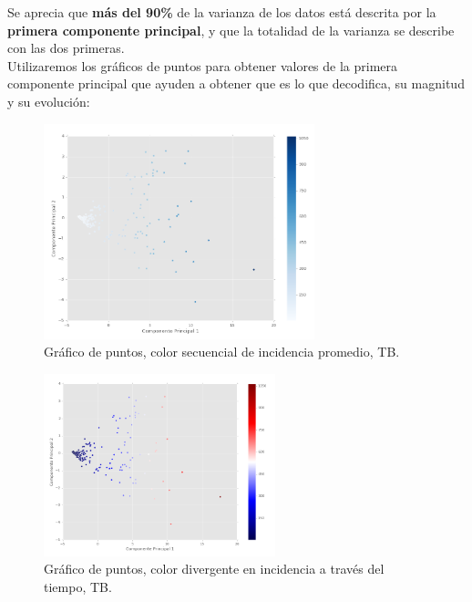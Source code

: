 \documentclass[letter, 10pt]{article}
\begin{document}
Se aprecia que \textbf{más del 90\%} de la varianza de los datos está descrita por la \textbf{primera componente principal}, y que la totalidad de la varianza se describe con las dos primeras.\\

Utilizaremos los gráficos de puntos para obtener valores de la primera componente principal que ayuden a obtener que es lo que decodifica, su magnitud y su evolución:

\begin{figure}[H]
\begin{center}
\includegraphics[width=0.7\textwidth]{Images/2-2sca1.png}
\caption{Gráfico de puntos, color secuencial de incidencia promedio, TB.}
\end{center}
\end{figure}

\begin{figure}[H]
\begin{center}
\includegraphics[width=0.6\textwidth]{Images/2-3sca2.png}
\caption{Gráfico de puntos, color divergente en incidencia a través del tiempo, TB.}
\end{center}
\end{figure}
\end{document}

